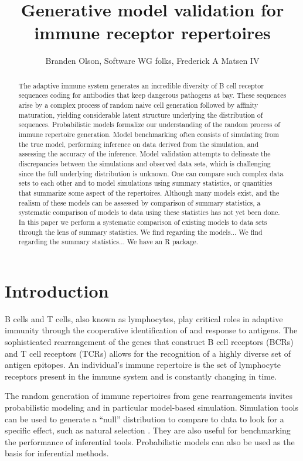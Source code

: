 \documentclass{article}
\title{Generative model validation for immune receptor repertoires}
\author{Branden Olson, Software WG folks, Frederick A Matsen IV}
\begin{document}
\maketitle

\begin{abstract}
The adaptive immune system generates an incredible diversity of B cell receptor sequences coding for antibodies that keep dangerous pathogens at bay.
These sequences arise by a complex process of random naive cell generation followed by affinity maturation, yielding considerable latent structure underlying the distribution of sequences.
Probabilistic models formalize our understanding of the random process of immune repertoire generation.
Model benchmarking often consists of simulating from the true model, performing inference on data derived from the simulation, and assessing the accuracy of the inference.
Model validation attempts to delineate the discrepancies between the simulations and observed data sets, which is challenging since the full underlying distribution is unknown.
One can compare such complex data sets to each other and to model simulations using summary statistics, or quantities that summarize some aspect of the repertoires.
Although many models exist, and the realism of these models can be assessed by comparison of summary statistics, a systematic comparison of models to data using these statistics has not yet been done.
In this paper we perform a systematic comparison of existing models to data sets through the lens of summary statistics.
We find regarding the models...
We find regarding the summary statistics...
We have an R package.
\end{abstract}

\section*{Introduction}

B cells and T cells, also known as lymphocytes, play critical roles in adaptive immunity through the cooperative identification of and response to antigens.
The sophisticated rearrangement of the genes that construct B cell receptors (BCRs) and T cell receptors (TCRs) allows for the recognition of a highly diverse set of antigen epitopes.
An individual's immune repertoire is the set of lymphocyte receptors present in the immune system and is constantly changing in time.

The random generation of immune repertoires from gene rearrangements invites probabilistic modeling and in particular model-based simulation.
Simulation tools can be used to generate a ``null'' distribution to compare to data to look for a specific effect, such as natural selection \cite{Yaari2012-kk}.
They are also useful for benchmarking the performance of inferential tools.
Probabilistic models can also be used as the basis for inferential methods.
\end{document}
